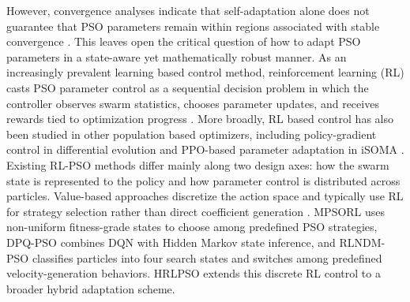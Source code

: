 \documentclass[final,5p,times]{elsarticle}
\begin{document}
However, convergence analyses indicate that self-adaptation alone does not guarantee that PSO parameters remain within regions associated with stable convergence \cite{Harrison2018Selfadaptive}. This leaves open the critical question of how to adapt PSO parameters in a state-aware yet mathematically robust manner.
As an increasingly prevalent learning based control method, reinforcement learning (RL) casts PSO parameter control as a sequential decision problem in which the controller observes swarm statistics, chooses parameter updates, and receives rewards tied to optimization progress \cite{Sutton2018Reinforcement, Bai2023Evolutionary}.
More broadly, RL based control has also been studied in other population based optimizers, including policy-gradient control in differential evolution and PPO-based parameter adaptation in iSOMA \cite{Sun2021Learning, Klein2024Optimizing}.
Existing RL-PSO methods differ mainly along two design axes: how the swarm state is represented to the policy and how parameter control is distributed across particles.
Value-based approaches discretize the action space and typically use RL for strategy selection rather than direct coefficient generation \cite{Watkins1992Qlearning}.
MPSORL \cite{Meng2023Multistrategy} uses non-uniform fitness-grade states to choose among predefined PSO strategies, DPQ-PSO \cite{Aoun2024Deep} combines DQN with Hidden Markov state inference, and RLNDM-PSO \cite{Li2023Reinforcement} classifies particles into four search states and switches among predefined velocity-generation behaviors.
HRLPSO \cite{Liu2023HRLPSO} extends this discrete RL control to a broader hybrid adaptation scheme.
\end{document}
